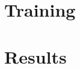 \documentclass[conference]{IEEEtran}
\begin{document}
\section{Training}
    
\section{Results}

\end{document}
